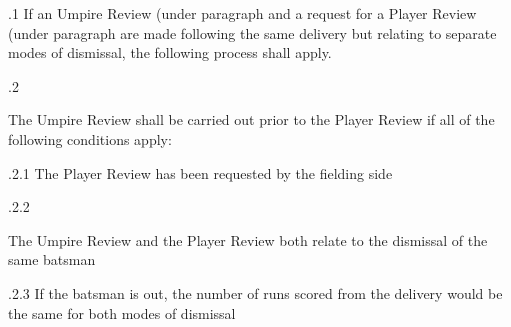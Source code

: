 \documentclass[12pt]{article}
\begin{document}
\vspace{\baselineskip}
\begin{adjustwidth}{0.5in}{0.1in}
{\fontsize{9pt}{10.8pt}.1 \tabto{0.49in} If an Umpire Review (under paragraph and a request for a Player Review (under paragraph are made following the same delivery but relating to separate modes of dismissal, the following process shall apply.\par}\par

\end{adjustwidth}


\vspace{\baselineskip}
{\fontsize{9pt}{10.8pt}.2 \tabto{0.49in} {\fontsize{8pt}{9.6pt}\selectfont The Umpire Review shall be carried out prior to the Player Review if all of the following conditions apply:\par}\par}\par


\vspace{\baselineskip}
\begin{adjustwidth}{0.49in}{0.0in}
{\fontsize{9pt}{10.8pt}.2.1 \tabto{1.17in} The Player Review has been requested by the fielding side\par}\par

\end{adjustwidth}


\vspace{\baselineskip}
\begin{adjustwidth}{0.49in}{0.0in}
{\fontsize{9pt}{10.8pt}.2.2 \tabto{1.17in} {\fontsize{8pt}{9.6pt}\selectfont The Umpire Review and the Player Review both relate to the dismissal of the same batsman\par}\par}\par

\end{adjustwidth}


\vspace{\baselineskip}
\begin{adjustwidth}{1.18in}{0.17in}
{\fontsize{9pt}{10.8pt}.2.3 \tabto{1.17in} If the batsman is out, the number of runs scored from the delivery would be the same for both modes of dismissal\par}\par

\end{adjustwidth}
\end{document}
